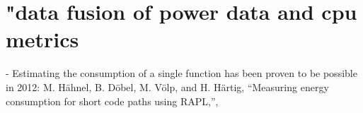 \section{"data fusion of power data and cpu metrics}
- Estimating the consumption of a single function has been proven to be possible in 2012: M. Hähnel, B. Döbel, M. Völp, and H. Härtig, “Measuring energy consumption for short code paths using RAPL,”, \parencite{hahnel2012measuring}






